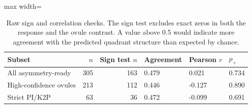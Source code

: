 \begin{table}[H]
\centering
\small
\begin{adjustbox}{max width=\linewidth}
\begin{tabular}{lrrlll}
\toprule
Subset & $n$ & Sign test $n$ & Agreement & Pearson $r$ & $p_+$ \\
\midrule
All asymmetry-ready & 305 & 163 & 0.479 & 0.021 & 0.734 \\
High-confidence ovules & 213 & 112 & 0.446 & -0.127 & 0.890 \\
Strict PI/K2P & 63 & 36 & 0.472 & -0.099 & 0.691 \\
\bottomrule
\end{tabular}
\end{adjustbox}
\caption{Raw sign and correlation checks. The sign test excludes exact zeros in both the response and the ovule contrast. A value above 0.5 would indicate more agreement with the predicted quadrant structure than expected by chance.}
\label{tab:sign-checks}
\end{table}

